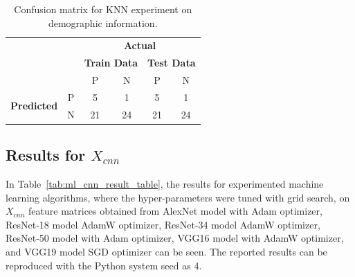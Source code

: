 \begin{table}[!h]
	\centering
	\caption{Confusion matrix for KNN experiment on demographic information.}
	\label{tab:knn_conf_matrix_xinfo}
	\begin{tabular}{|cc|c|c|c|c|}
		\cline{1-6}
		&   & \multicolumn{4}{c|}{\textbf{Actual}}                                                                                                                                                                                       \\ \cline{3-6} 
		&   & \multicolumn{2}{c|}{\textbf{Train Data}} & \multicolumn{2}{c|}{\textbf{Test Data}} \\ \cline{3-6} 
		&   & \text{\:\:} P \text{\:\:}                                                   & N                                                    & \text{\:} P \text{\:}                                                   & N                                                   \\ \hline
		\multicolumn{1}{|c|}{\multirow{2}{*}{\textbf{Predicted}}} & P & 5                                                     & 1                                                    & 5                                                     & 1                                                   \\ \cline{2-6} 
		\multicolumn{1}{|c|}{}                                    & N & 21                                                    & 24                                                   & 21                                                    & 24                                                  \\ \hline
	\end{tabular}
\end{table}

\subsection{Results for $X_{cnn}$} \label{CH6:results_xcnn}

In Table~\ref{tab:ml_cnn_result_table}, the results for experimented machine learning algorithms, where the hyper-parameters were tuned with grid search, on $X_{cnn}$ feature matrices obtained from AlexNet model with Adam optimizer, ResNet-18 model AdamW optimizer, ResNet-34 model AdamW optimizer, ResNet-50 model with Adam optimizer, VGG16 model with AdamW optimizer, and VGG19 model SGD optimizer can be seen. The reported results can be reproduced with the Python system seed as 4.


